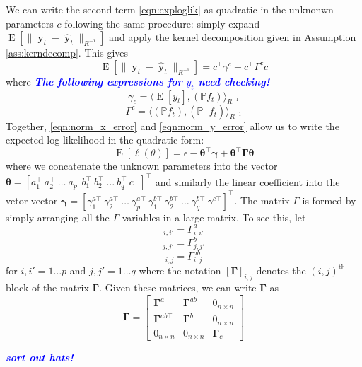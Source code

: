 \documentclass{IEEEtran}
\newcommand{\todo}[1]{\textsf{\emph{\textbf{\textcolor{blue}{#1}}}}}
\newcommand{\inner}[3]{\langle#1,#2\rangle_{#3}}
\newcommand{\dist}[2]{\|#1\|_{#2}}
\DeclareMathOperator{\E}{E}
\DeclareMathOperator{\yvec}{\mathbf{y}}
\begin{document}
We can write the second term \ref{eqn:exploglik} as quadratic in the unknonwn parameters $c$ following the same procedure: simply expand $\E[\dist{\yvec_t-\hat{\yvec}_t}{R^{-1}}]$ and apply the kernel decomposition given in Assumption \ref{ass:kerndecomp}. This gives
\begin{equation}
	\label{eqn:norm_y_error}
	\E[\dist{\yvec_t-\hat{\yvec}_t}{R^{-1}}] = c^\top \gamma^c + c^\top \Gamma^c c
\end{equation}
where \todo{The following expressions for $y_t$ need checking!}
\begin{equation}
	\gamma_c = \inner
	{\E[y_t]}
	{(\mathbb{P} f_t)}
	{R^{-1}}
\end{equation}
\begin{equation}
	 \Gamma^c = \inner
		{(\mathbb{P} f_t)}
		{(\mathbb{P}^\top f_t)}
		{R^{-1}}
\end{equation}
Together, \ref{eqn:norm_x_error} and \ref{eqn:norm_y_error} allow us to write the expected log likelihood in the quadratic form:
\begin{equation}
	\E[\ell(\theta)] = \epsilon - \boldsymbol{\theta}^\top \boldsymbol{\gamma} + \boldsymbol{\theta}^\top \boldsymbol{\Gamma} \boldsymbol{\theta}
\end{equation}
where we concatenate the unknown parameters into the vector $\boldsymbol{\theta} = [a_1^\top ~ a_2^\top ~ \ldots ~ a_p^\top ~ b_1^\top ~ b_2^\top ~ \ldots ~ b_q^\top ~ c^\top]^\top$ and similarly the linear coefficient into the vetor vector $\boldsymbol{\gamma} = [\gamma^{a\top}_1 ~ \gamma^{a\top}_2 ~ \ldots ~ \gamma^{a\top}_p ~ \gamma^{b\top}_1 ~ \gamma^{b\top}_2 ~ \ldots ~ \gamma^{b\top}_q ~ \gamma^{c\top}]^\top$. The matrix $\Gamma$ is formed by simply arranging all the $\Gamma$-variables in a large matrix. To see this, let 
\begin{equation}
	[\boldsymbol{\Gamma}^a]_{i,i'} = \Gamma_{i,i'}^a 
\end{equation}
\begin{equation}
	[\boldsymbol{\Gamma}^b]_{j,j'} = \Gamma_{j,j'}^b 
\end{equation}
\begin{equation}
	[\boldsymbol{\Gamma}^{ab}]_{i,j} = \Gamma_{i,j}^{ab}
\end{equation}
for $i,i' = 1 \ldots p$ and $j,j' = 1 \ldots q$ where the notation $[\boldsymbol{\Gamma}]_{i,j}$ denotes the $(i,j)^\mathrm{th}$ block of the matrix $\boldsymbol{\Gamma}$. Given these matrices, we can write $\boldsymbol{\Gamma}$ as 
\begin{equation}
	\boldsymbol{\Gamma} = \begin{bmatrix}
		\boldsymbol{\Gamma}^a & \boldsymbol{\Gamma}^{ab} & 0_{n\times n} \\
		\boldsymbol{\Gamma}^{ab\top} & \boldsymbol{\Gamma}^{b} & 0_{n\times n} \\
		0_{n\times n} & 0_{n\times n} & \boldsymbol{\Gamma}_c
	\end{bmatrix}
\end{equation}

\todo{sort out hats!}

\newpage
\end{document}
